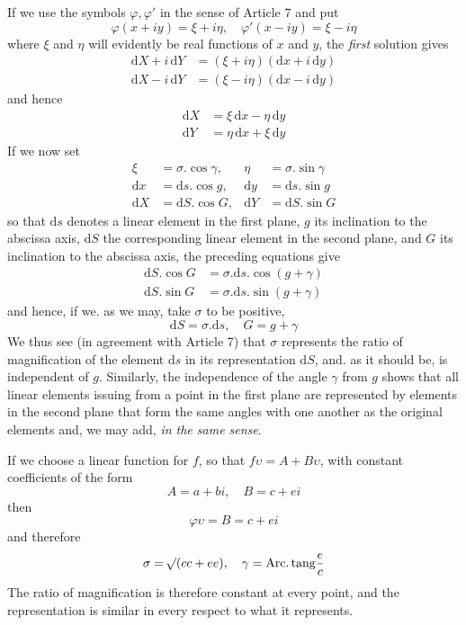 If we use the symbols \(\varphi,\varphi'\) in the sense of Article 7 and put
\[
\varphi(x+iy)=\xi+i\eta,\quad\varphi'(x-iy)=\xi-i\eta
\]
\noindent where \(\xi\) and \(\eta\) will evidently be real functions of \(x\) and \(y\), the \textit{first} solution gives
\[
\begin{aligned}
\mathrm{d}X+i\,\mathrm{d}Y&=(\xi+i\eta)(\mathrm{d}x+i\,\mathrm{d}y)\\
\mathrm{d}X-i\,\mathrm{d}Y&=(\xi-i\eta)(\mathrm{d}x-i\,\mathrm{d}y)
\end{aligned}
\]
\noindent and hence
\[
\begin{aligned}
\mathrm{d}X&=\xi\,\mathrm{d}x-\eta\,\mathrm{d}y\\
\mathrm{d}Y&=\eta\,\mathrm{d}x+\xi\,\mathrm{d}y
\end{aligned}
\]
\noindent If we now set
\[
\begin{aligned}
\xi&=\sigma\mathord{.}\cos\gamma,&\eta&=\sigma\mathord{.}\sin\gamma\\
\mathrm{d}x&=\mathrm{d}s\mathord{.}\cos g,&\mathrm{d}y&=\mathrm{d}s\mathord{.}\sin g\\
\mathrm{d}X&=\mathrm{d}S\mathord{.}\cos G,&\mathrm{d}Y&=\mathrm{d}S\mathord{.}\sin G
\end{aligned}
\]
\noindent so that \(\mathrm{d}s\) denotes a linear element in the first plane, \(g\) its inclination to the abscissa axis, \(\mathrm{d}S\) the corresponding linear element in the second plane, and \(G\) its inclination to the abscissa axis, the preceding equations give
\[
\begin{aligned}
\mathrm{d}S\mathord{.}\cos G&=\sigma\mathord{.}\mathrm{d}s\mathord{.}\cos(g+\gamma)\\
\mathrm{d}S\mathord{.}\sin G&=\sigma\mathord{.}\mathrm{d}s\mathord{.}\sin(g+\gamma)
\end{aligned}
\]
\noindent and hence, if we. as we may, take \(\sigma\) to be positive,
\[
\mathrm{d}S=\sigma\mathord{.}\mathrm{d}s,\quad G=g+\gamma
\]
\noindent We thus see (in agreement with Article 7) that \(\sigma\) represents the ratio of magnification of the element \(\mathrm{d}s\) in its representation \(\mathrm{d}S\), and. as it should be, is independent of \(g\). Similarly, the independence of the angle \(\gamma\) from \(g\) shows that all linear elements issuing from a point in the first plane
are represented by elements in the second plane that form the same angles with one another as the original elements and, we may add, \textit{in the same sense}.

If we choose a linear function for \(f\), so that \(f\upsilon=A+B\upsilon\), with constant coefficients of the form
\[
A=a+bi,\quad B=c+ei
\]
\noindent then
\[
\varphi\upsilon=B=c+ei
\]
\noindent and therefore
\[
\sigma=\mathord{{}^{}\!\surd}(cc+ee),\quad\gamma=\mathrm{Arc.}\,\mathrm{tang}\frac{e}{c}
\]
\noindent The ratio of magnification is therefore constant at every point, and the representation is similar in every respect to what it represents.

